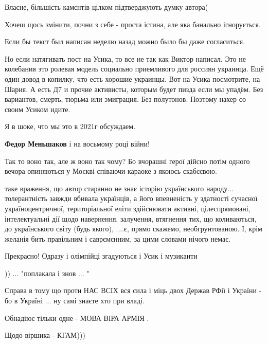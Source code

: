 \begin{itemize}
Власне, більшість камєнтів цілком підтверджують думку автора(

Хочеш щось змінити, почни з себе - проста істина, але яка банально ігнорується.


Если бы текст был написан неделю назад можно было бы даже согласиться.

Но если натягивать пост на Усика, то все не так как Виктор написал. Это не
колебания это ролевая модель социально приемливого для россиян украинца. Ещё
один довод в копилку, что есть хорошие украинцы. Вот на Усика посмотрите, на
Шария. А есть Д7 и прочие активисты, которым будет пизда если мы упадём. Без
вариантов, смерть, тюрьма или эмиграция. Без полутонов. Поэтому нахер со своим
Усиком идите.

Я в шоке, что мы это в 2021г обсуждаем.

\begin{itemize} %
\textbf{Федор Меньшаков} і на восьмому році війни!
\end{itemize} %


Так то воно так, але ж воно так чому? Бо вчорашні герої дійсно потім одного
вечора опиняються у Москві співаючи караоке з якоюсь скабєєвою.



таке враження, що автор старанно не знає історію українського
народу... толерантність завжди вбивала українців, а його впевненість у здатності
сучасної україноцентричної, територіальної еліти здійснювати активні,
цілеспрямовані, інтелектуальні дії щодо навернення, залучення, втягнення тих,
що коливаються, до українського світу (будь якого), ....є, прямо скажемо,
необгрунтованою. І, крім желанія бить правільним і саврємєнним, за цими словами
нічого немає.


Прекрасно! Одразу і олімпійці згадуються і Усик і музиканти


)) ... "поплакала і знов ... "

Справа в тому що проти НАС ВСІХ вся сила і міць двох Держав РФії і України - бо
в Україні ... ну самі знаєте хто при владі.

Обнадіює тільки одне - МОВА ВІРА АРМІЯ .

Щодо віршика - КГАМ)))



\end{itemize}
